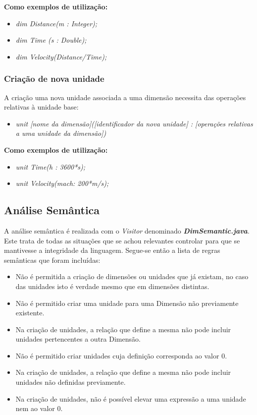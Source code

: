 \documentclass[10pt,portuguese]{article}
\begin{document}
\textbf{Como exemplos de utilização:}

\begin{itemize}
    \item \textit{dim Distance(m : Integer);}
    \item \textit{dim Time (s : Double);}
    \item \textit{dim Velocity(Distance/Time);}
\end{itemize}

\subsubsection{Criação de nova unidade}

\par A criação uma nova unidade associada a uma dimensão necessita das operações relativas à unidade base:

\begin{itemize}
    \item \textit{unit [nome da dimensão]([identificador da nova unidade] : [operações relativas a uma unidade da dimensão])}
\end{itemize}

\textbf{Como exemplos de utilização:}

\begin{itemize}
    \item \textit{unit Time(h : 3600*s);}
    \item \textit{unit Velocity(mach: 200*m/s);}
\end{itemize}

\subsection{Análise Semântica}

\par A análise semântica é realizada com o \emph{Visitor} denominado \textbf{\emph{DimSemantic.java}}. Este trata de todas as situações que se achou relevantes controlar para que se mantivesse a integridade da linguagem. Segue-se então a lista de regras semânticas que foram incluídas:
\begin{itemize}
    \item Não é permitida a criação de dimensões ou unidades que já existam, no caso das unidades isto é verdade mesmo que em dimensões distintas.
    \item Não é permitido criar uma unidade para uma Dimensão não previamente existente.
    \item Na criação de unidades, a relação que define a mesma não pode incluir unidades pertencentes a outra Dimensão.
    \item Não é permitido criar unidades cuja definição corresponda ao valor 0. 
    \item Na criação de unidades, a relação que define a mesma não pode incluir unidades não definidas previamente.
    \item Na criação de unidades, não é possível elevar uma expressão a uma unidade nem ao valor 0.
\end{itemize}
\end{document}
